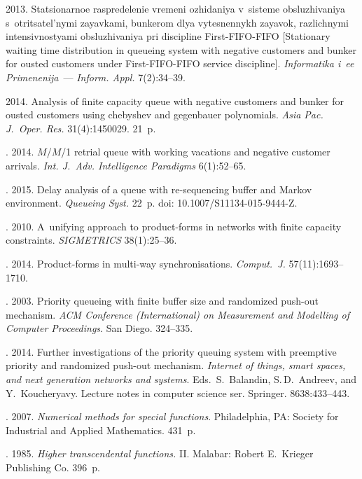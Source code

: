 \begin{multicols}{2}
{{\begin{thebibliography}{99}
 2013. Statsionarnoe raspredelenie vremeni ozhidaniya 
v~sisteme obsluzhivaniya s~otritsatel'nymi zayavkami, bunkerom dlya vytesnennykh 
zayavok, raz\-lich\-ny\-mi intensivnostyami obsluzhivaniya pri discipline 
First-FIFO-FIFO [Stationary waiting time distribution in queueing system with negative customers and bunker for ousted customers 
under First-FIFO-FIFO service discipline]. 
\textit{Informatika i~ee Primenenija}~---
\textit{Inform. Appl.} 7(2):34--39.

 2014. Analysis of finite capacity queue with negative customers and bunker for ousted customers using chebyshev and gegenbauer polynomials. 
\textit{Asia Pac. J.~Oper. Res.} 31(4):1450029. 21~p.

. 2014. 
$M$/$M$/1 retrial queue with working vacations and negative customer arrivals.
\textit{Int. J.~Adv. Intelligence Paradigms} 6(1):52--65.

. 2015. 
Delay analysis of a queue with re-sequencing buffer and Markov environment.
\textit{Queueing Syst.} 22~p. doi: 10.1007/S11134-015-9444-Z.


. 2010. 
A~unifying approach to product-forms in networks with finite capacity constraints. 
\textit{SIGMETRICS} 38(1):25--36.

. 2014. Product-forms in multi-way synchronisations. 
\textit{Comput.~J.} 57(11):1693--1710.

. 2003.
Priority queueing with finite buffer size and randomized push-out mechanism. 
\textit{ACM  Conference (International) on Measurement and Modelling of Computer
Proceedings}. San Diego. 324--335.

. 2014. 
Further investigations of the priority queuing system with preemptive priority 
and randomized push-out mechanism. 
\textit{Internet of things, smart spaces, and next generation networks and systems}. 
Eds.\ S.~Balandin, S.\,D.~Andreev, and  Y.~Koucheryavy. 
Lecture notes in computer science ser. 
Springer. 8638:433--443.

. 2007. 
\textit{Numerical methods for special functions}. Philadelphia, PA: 
Society for Industrial and Applied Mathematics. 431~p.

. 1985. 
\textit{Higher transcendental functions.} II. Malabar: Robert
E.~Krieger Publishing Co. 396~p.


\end{thebibliography} } }

\end{multicols}

